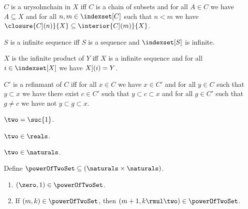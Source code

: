 \begin{definition}\label{urysohnchain_without_cardinality}
    $C$ is a urysohnchain in $X$ iff
    $C$ is a chain of subsets and
    for all $A \in C$ we have $A \subseteq X$ and
    for all $n,m \in \indexset[C]$ such that $n < m$ we have $\closure{\index[C](n)}{X} \subseteq \interior{\index[C](m)}{X}$.
\end{definition}

\begin{abbreviation}\label{infinte_sequence}
    $S$ is a infinite sequence iff $S$ is a sequence and $\indexset[S]$ is infinite.
\end{abbreviation}

\begin{definition}\label{infinite_product}
    $X$ is the infinite product of $Y$ iff
    $X$ is a infinite sequence and for all $i \in \indexset[X]$ we have $\index[X](i) = Y$.
\end{definition}

\begin{definition}\label{refinmant}
    $C'$ is a refinmant of $C$ iff for all $x \in C$ we have $x \in C'$ and 
    for all $y \in C$ such that $y \subset x$ we have there exist $c \in C'$ such that $y \subset c \subset x$
    and for all $g \in C'$ such that $g \neq c$ we have not $y \subset g \subset x$.
\end{definition}

\begin{abbreviation}\label{two}
    $\two = \suc{1}$.
\end{abbreviation}

\begin{lemma}\label{two_in_reals}
    $\two \in \reals$.
\end{lemma}

\begin{lemma}\label{two_in_naturals}
    $\two \in \naturals$.
\end{lemma}

\begin{inductive}\label{power_of_two}
    Define $\powerOfTwoSet \subseteq (\naturals \times \naturals)$.
    \begin{enumerate}
        \item  $(\zero, 1) \in \powerOfTwoSet$.
        \item  If $(m,k) \in \powerOfTwoSet$, then $(m+1, k \rmul \two) \in \powerOfTwoSet$.
    \end{enumerate}
\end{inductive}


